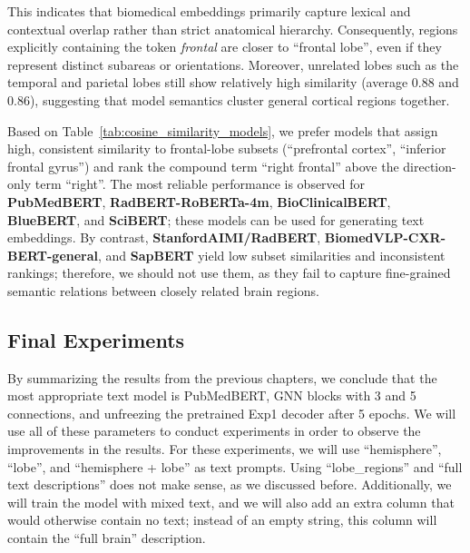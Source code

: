 \documentclass[a4paper,12pt]{article}
\begin{document}
This indicates that biomedical embeddings primarily capture lexical and contextual overlap rather than strict anatomical hierarchy. Consequently, regions explicitly containing the token \textit{frontal} are closer to ``frontal lobe'', even if they represent distinct subareas or orientations. Moreover, unrelated lobes such as the temporal and parietal lobes still show relatively high similarity (average 0.88 and 0.86), suggesting that model semantics cluster general cortical regions together.

Based on Table~\ref{tab:cosine_similarity_models}, we prefer models that assign high, consistent similarity to frontal-lobe subsets (``prefrontal cortex'', ``inferior frontal gyrus'') and rank the compound term ``right frontal'' above the direction-only term ``right''. The most reliable performance is observed for \textbf{PubMedBERT}, \textbf{RadBERT-RoBERTa-4m}, \textbf{BioClinicalBERT}, \textbf{BlueBERT}, and \textbf{SciBERT}; these models can be used for generating text embeddings. By contrast, \textbf{StanfordAIMI/RadBERT}, \textbf{BiomedVLP-CXR-BERT-general}, and \textbf{SapBERT} yield low subset similarities and inconsistent rankings; therefore, we should not use them, as they fail to capture fine-grained semantic relations between closely related brain regions.

\subsection{Final Experiments}

By summarizing the results from the previous chapters, we conclude that the most appropriate text model is PubMedBERT, GNN blocks with 3 and 5 connections, and unfreezing the pretrained Exp1 decoder after 5 epochs. We will use all of these parameters to conduct experiments in order to observe the improvements in the results. For these experiments, we will use ``hemisphere'', ``lobe'', and ``hemisphere + lobe'' as text prompts. Using ``lobe\_regions'' and ``full text descriptions'' does not make sense, as we discussed before. Additionally, we will train the model with mixed text, and we will also add an extra column that would otherwise contain no text; instead of an empty string, this column will contain the ``full brain'' description.
\end{document}
